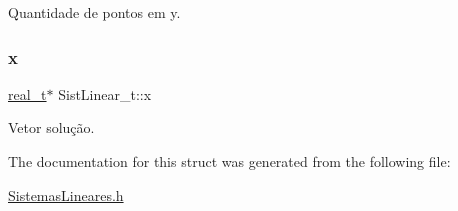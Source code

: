 Quantidade de pontos em y. \mbox{\label{structSistLinear__t_a106437fbdef1dee46d7b1c34509e0da1}} 
\subsubsection{\texorpdfstring{x}{x}}
{\footnotesize\ttfamily \hyperlink{SistemasLineares_8h_a0d00e2b3dfadee81331bbb39068570c4}{real\+\_\+t}$\ast$ Sist\+Linear\+\_\+t\+::x}

Vetor solução. 

The documentation for this struct was generated from the following file\+:\begin{DoxyCompactItemize}
\item 
\hyperlink{SistemasLineares_8h}{Sistemas\+Lineares.\+h}\end{DoxyCompactItemize}
